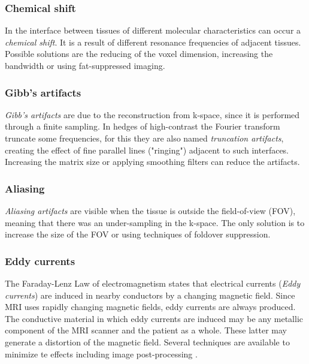   \subsubsection*{Chemical shift}
  In the interface between tissues of different molecular characteristics can occur a \emph{chemical shift}. It is a result of different resonance frequencies of adjacent tissues. Possible solutions are the reducing of the voxel dimension, increasing the bandwidth or using fat-suppressed imaging.
  \subsubsection*{Gibb's artifacts}
  \emph{Gibb's artifacts} are due to the reconstruction from k-space, since it is performed through a finite sampling. In hedges of high-contrast the Fourier transform truncate some frequencies, for this they are also named \emph{truncation artifacts}, creating the effect of fine parallel lines ("ringing") adjacent to such interfaces. Increasing the matrix size or applying smoothing filters can reduce the artifacts.
  \subsubsection*{Aliasing}
  \emph{Aliasing artifacts} are visible when the tissue is outside the field-of-view (FOV), meaning that there was an under-sampling in the k-space. The only solution is to increase the size of the FOV or using techniques of foldover suppression.
  \subsubsection*{Eddy currents}
  The Faraday-Lenz Law of electromagnetism states that electrical currents (\emph{Eddy currents}) are induced in nearby conductors by a changing magnetic field. Since MRI uses rapidly changing magnetic fields, eddy currents are always produced. The conductive material in which eddy currents are induced may be any metallic component of the MRI scanner and the patient as a whole. These latter may generate a distortion of the magnetic field. Several techniques are available to minimize te effects including image post-processing \cite{QeA_MRI}.

  \begin{figure}[h]
     \centering
     \caption{}
     \label{fig:artifacts}
  \end{figure}


